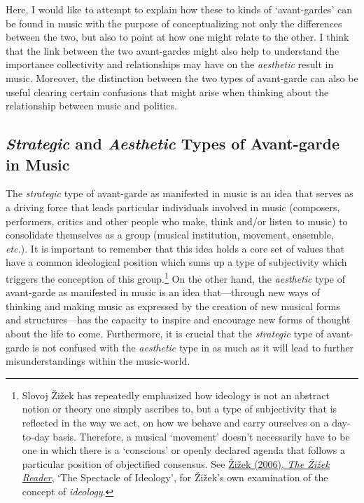 Here, I would like to attempt to explain how these to kinds of `avant-gardes' can be found in music with the purpose of conceptualizing not only the differences between the two, but also to point at how one might relate to the other. I think that the link between the two avant-gardes might also help to understand the importance collectivity and relationships may have on the \emph{aesthetic} result in music. Moreover, the distinction between the two types of avant-garde can also be useful clearing certain confusions that might arise when thinking about the relationship between music and politics.  

\subsection{\emph{Strategic} and \emph{Aesthetic} Types of Avant-garde in Music}

The \emph{strategic} type of avant-garde as manifested in music is an idea that serves as a driving force that leads particular individuals involved in music (composers, performers, critics and other people who make, think and/or listen to music) to consolidate themselves as a group (musical institution, movement, ensemble, \emph{etc.}). It is important to remember that this idea holds a core set of values that have a common ideological position which sums up a type of subjectivity which triggers the conception of this group.\footnote{Slovoj \v{Z}i\v{z}ek has repeatedly emphasized how ideology is not an abstract notion or theory one simply ascribes to, but a type of subjectivity that is reflected in the way we act, on how we behave and carry ourselves on a day-to-day basis. Therefore, a musical `movement' doesn't necessarily have to be one in which there is a `conscious' or openly declared agenda that follows a particular position of objectified consensus. See \hyperlink{zizekreader}{\v{Z}i\v{z}ek (2006), \emph{The \v{Z}i\v{z}ek Reader}}, `The Spectacle of Ideology', for \v{Z}i\v{z}ek's own examination of the concept of \emph{ideology}.} On the other hand,  the \emph{aesthetic} type of avant-garde as manifested in music is an idea that---through new ways of thinking and making music as expressed by the creation of new musical forms and structures---has the capacity to inspire and encourage new forms of thought about the life to come.  Furthermore, it is crucial that the \emph{strategic} type of avant-garde is not confused with the \emph{aesthetic} type in as much as it will lead to further misunderstandings within the music-world. 

